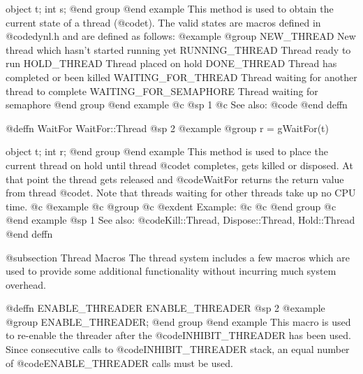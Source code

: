 object  t;
int     s;
@end group
@end example
This method is used to obtain the current state of a thread (@code{t}).
The valid states are macros defined in @code{dynl.h} and are defined as
follows:
@example
@group
NEW_THREAD             New thread which hasn't started running
                       yet
RUNNING_THREAD         Thread ready to run
HOLD_THREAD            Thread placed on hold
DONE_THREAD            Thread has completed or been killed
WAITING_FOR_THREAD     Thread waiting for another thread to
                       complete
WAITING_FOR_SEMAPHORE  Thread waiting for semaphore
@end group
@end example
@c @sp 1
@c See also:  @code{}
@end deffn
















@deffn {WaitFor} WaitFor::Thread
@sp 2
@example
@group
r = gWaitFor(t)

object  t;
int     r;
@end group
@end example
This method is used to place the current thread on hold until thread
@code{t} completes, gets killed or disposed.  At that point the thread
gets released and @code{WaitFor} returns the return value from thread
@code{t}.  Note that threads waiting for other threads take up no CPU time.
@c @example
@c @group
@c @exdent Example:
@c 
@c @end group
@c @end example
@sp 1
See also:  @code{Kill::Thread, Dispose::Thread, Hold::Thread}
@end deffn







@subsection Thread Macros
The thread system includes a few macros which are used to provide
some additional functionality without incurring much system overhead.

















@deffn {ENABLE_THREADER} ENABLE_THREADER
@sp 2
@example
@group
ENABLE_THREADER;
@end group
@end example
This macro is used to re-enable the threader after the
@code{INHIBIT_THREADER} has been used.  Since consecutive calls to
@code{INHIBIT_THREADER} stack, an equal number of @code{ENABLE_THREADER}
calls must be used.

